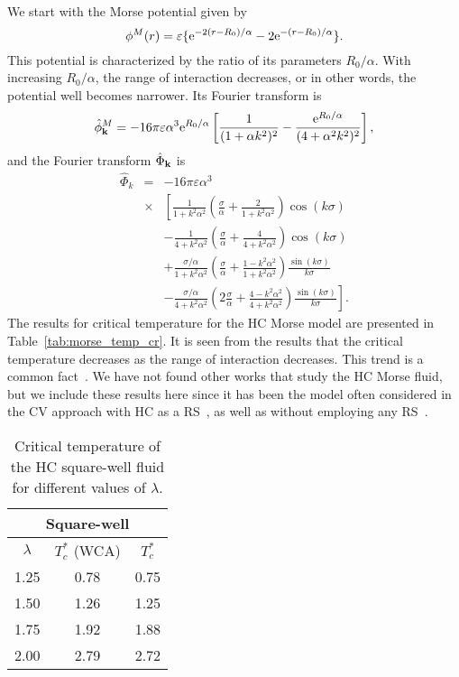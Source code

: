 We start with the Morse potential given by
\begin{equation*}
	\phi^M(r) = \varepsilon \{{\rm e}^{-2(r-R_0)/\alpha}-2{\rm e}^{-(r-R_0)/\alpha}\}.
\end{equation*}
This potential is characterized by the ratio of its parameters $R_0/\alpha$. With increasing $R_0/\alpha$, the range of interaction decreases, or in other words, the potential well becomes narrower.
Its Fourier transform is
\begin{equation*}
	\hat{\phi}^M_{\vb k} = -16\pi\varepsilon\alpha^3 {\rm e}^{R_0/\alpha} 
	\left[\frac{1}{(1 + \alpha k^2)^2} - \frac{{\rm e}^{R_0/\alpha}}{(4 + \alpha^2 k^2)^2}\right],
\end{equation*}
and the Fourier transform $\hat{\Phi}_{\vb k}$ is
\begin{eqnarray*}
	\label{eq:part_morse_fourier}
	\hat{\Phi}_k &=& -16\pi \varepsilon \alpha^3 
	\\
	&\times&
	\left[
	\frac{1}{1+k^2\alpha^2}\left(\frac{\sigma}{\alpha} + \frac{2}{1+k^2\alpha^2}\right) \cos(k\sigma)
	\right.
	\nonumber\\
	&& \left.
	-\frac{1}{4 + k^2\alpha^2} \left(\frac{\sigma}{\alpha} + \frac{4}{4 + k^2\alpha^2}\right) \cos(k\sigma)
	\right.
	\nonumber \\
	&& \left.
	+ \frac{\sigma/\alpha}{1 + k^2\alpha^2} \left(\frac{\sigma}{\alpha} + \frac{1 - k^2\alpha^2}{1 + k^2 \alpha^2}\right) \frac{\sin(k\sigma)}{k\sigma}
	\right.
	\nonumber\\
	&& \left.
	- \frac{\sigma/\alpha}{4 + k^2\alpha^2} \left(2\frac{\sigma}{\alpha} + \frac{4 - k^2\alpha^2}{4 + k^2\alpha^2}\right) \frac{\sin(k\sigma)}{k\sigma}
	\right].
\end{eqnarray*}
The results for critical temperature for the HC Morse model are presented in Table~\ref{tab:morse_temp_cr}. It is seen from the results that the critical temperature decreases as the range of interaction decreases. This trend is a common fact~\cite{KreiciNezbeda2012,MendoubWaxJakse2010}.
We have not found other works that study the HC Morse fluid, but we include these results here since it has been the model often considered in the CV approach with HC as a RS~\cite{Yukh1990,YukhJSP1995,PatsJSP1995}, as well as without employing any RS~\cite{PylMpkDobUPJ2023b,PylJML2023}.

\begin{table}[h]
	\noindent\caption{Critical temperature of the HC square-well fluid for different values of $\lambda$.}\vskip3mm
	\begin{tabular}{|c|c|c|}
		\hline
		\multicolumn{3}{|c|}{Square-well}\\
		\hline
		$\lambda$ & $T_c^*$ (WCA) & $T_c^*$ \cite{KreiciNezbeda2012} \\
		\hline
		1.25 & 0.78 & 0.75 \\
		1.50 & 1.26 & 1.25 \\
		1.75 & 1.92 & 1.88 \\
		2.00  & 2.79 & 2.72 \\
		\hline
	\end{tabular}
	\label{tab:sw_temp_cr}
\end{table}

